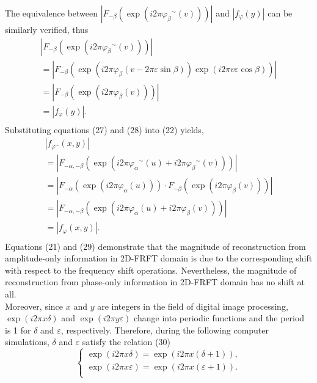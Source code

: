 \documentclass[journal]{IEEEtran}
\begin{document}
The equivalence between $|{{F_{ - \beta }}(\exp (i2\pi {\varphi _\beta }^\sim(v)))}|$ and $|{{f_\varphi }(y)}|$ can be similarly verified, thus
\begin{equation}
\begin{array}{l}
 \left| {{F_{ - \beta }}(\exp (i2\pi {\varphi _\beta }^\sim(v)))} \right| \\
  = \left| {{F_{ - \beta }}(\exp (i2\pi {\varphi _\beta }(v - 2\pi \varepsilon \sin \beta ))\exp (i2\pi v\varepsilon \cos \beta ))} \right| \\
  = \left| {{F_{ - \beta }}(\exp (i2\pi {\varphi _\beta }(v)))} \right| \\
  = \left| {{f_\varphi }(y)} \right|.\\
 \end{array}
\end{equation}
Substituting equations (27) and (28) into (22) yields,
\begin{equation}
\begin{array}{l}
  \left| {{f_{{\varphi ^\sim}}}(x,y)} \right| \\
 =\left| {{F_{ - \alpha , - \beta }}(\exp (i2\pi {\varphi _\alpha }^\sim(u) + i2\pi {\varphi _\beta }^\sim(v)))} \right| \\
  = \left| {{F_{ - \alpha }}(\exp (i2\pi {\varphi _\alpha }(u)))} \cdot {{F_{ - \beta }}(\exp (i2\pi {\varphi _\beta }(v)))} \right| \\
  = \left|{F_{ - \alpha , - \beta }}(\exp (i2\pi {\varphi _\alpha }(u) + i2\pi {\varphi _\beta }(v)))\right|\\
  = \left| {{f_{\varphi}}(x,y)} \right|. \\
 \end{array}
\end{equation}
Equations (21) and (29) demonstrate that the magnitude of reconstruction from amplitude-only information in 2D-FRFT domain is due to the corresponding shift with respect to the frequency shift operations. Nevertheless, the magnitude of reconstruction from phase-only information in 2D-FRFT domain has no shift at all.\\\indent Moreover, since $x$ and $y$ are integers in the field of digital image processing, $ \exp (i2\pi x\delta ) $ and $\exp (i2\pi y\varepsilon ) $ change into periodic functions and the period is 1 for $\delta$ and $\varepsilon$, respectively. Therefore, during the following computer simulations, $\delta$ and $\varepsilon$ satisfy the relation (30)
\begin{equation}
\left\{ \begin{array}{l}
 \exp (i2\pi x\delta ) = \exp (i2\pi x(\delta  + 1)), \\
 \exp (i2\pi x\varepsilon ) = \exp (i2\pi x(\varepsilon  + 1)). \\
 \end{array} \right.
\end{equation}
\end{document}
